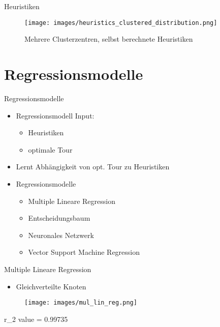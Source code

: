 \begin{frame}{Heuristiken}
    \begin{figure}
        \centering
        \texttt{[image: images/heuristics\_clustered\_distribution.png]}
        \caption{Mehrere Clusterzentren, selbst berechnete Heuristiken}
    \end{figure}
\end{frame} 

\section{Regressionsmodelle}
\begin{frame}{Regressionsmodelle}
    \begin{itemize}
        \item Regressionsmodell Input:
        \begin{itemize}
            \item Heuristiken
            \item optimale Tour
        \end{itemize}
        \item Lernt Abhängigkeit von opt. Tour zu Heuristiken
        \item Regressionsmodelle
        \begin{itemize}
            \item Multiple Lineare Regression
            \item Entscheidungsbaum
            \item Neuronales Netzwerk
            \item Vector Support Machine Regression
        \end{itemize}
    \end{itemize}
\end{frame}

\begin{frame}{Multiple Lineare Regression}
    \begin{itemize}
        \item Gleichverteilte Knoten
    \end{itemize}
    \begin{figure}
        \centering
        \texttt{[image: images/mul\_lin\_reg.png]}
        \label{fig:enter-label}
    \end{figure}
    \centering
        r_2 value = 0.99735
\end{frame}

